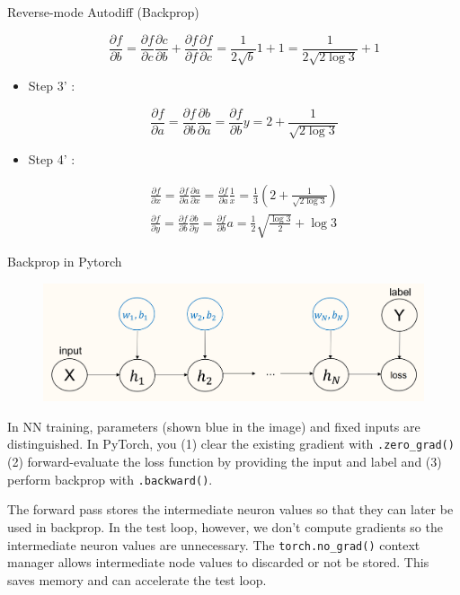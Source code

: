 \begin{frame}[allowframebreaks]
\begin{myexampleblock}{6.43}{Reverse-mode Autodiff (Backprop)}
\begin{itemize}
        $$
        \frac{\partial f}{\partial b}=\frac{\partial f}{\partial c} \frac{\partial c}{\partial b}+\frac{\partial f}{\partial f} \frac{\partial f}{\partial c}=\frac{1}{2 \sqrt{b}} 1+1=\frac{1}{2 \sqrt{2 \log 3}}+1
        $$
        \item
        Step 3' :

        $$
        \frac{\partial f}{\partial a}=\frac{\partial f}{\partial b} \frac{\partial b}{\partial a}=\frac{\partial f}{\partial b} y=2+\frac{1}{\sqrt{2 \log 3}}
        $$
        \item
        Step 4' :

        $$
        \begin{gathered}
        \frac{\partial f}{\partial x}=\frac{\partial f}{\partial a} \frac{\partial a}{\partial x}=\frac{\partial f}{\partial a} \frac{1}{x}=\frac{1}{3}\left(2+\frac{1}{\sqrt{2 \log 3}}\right) \\
        \frac{\partial f}{\partial y}=\frac{\partial f}{\partial b} \frac{\partial b}{\partial y}=\frac{\partial f}{\partial b} a=\frac{1}{2} \sqrt{\frac{\log 3}{2}}+\log 3
        \end{gathered}
        $$
    \end{itemize}
\end{myexampleblock}

\end{frame}

\begin{frame}[allowframebreaks]

\begin{myconceptblock}{6.44}{Backprop in Pytorch}
    \begin{figure}[H]
        \centering
        \includegraphics[width=1.0\textwidth]{.././assets/6.13.png}
    \end{figure}

    In NN training, parameters (shown blue in the image) and fixed inputs are distinguished.
    In PyTorch, you (1) clear the existing gradient with \verb|.zero_grad()|
    (2) forward-evaluate the loss function by providing the input and label and
    (3) perform backprop with \verb|.backward()|.

    The forward pass stores the intermediate neuron values so that they can later be used in backprop. In the test loop, however, we don't compute gradients so the intermediate neuron values are unnecessary.
    The \verb|torch.no_grad()| context manager allows intermediate node values to discarded or not be stored.
    This saves memory and can accelerate the test loop.
\end{myconceptblock}

\end{frame}

